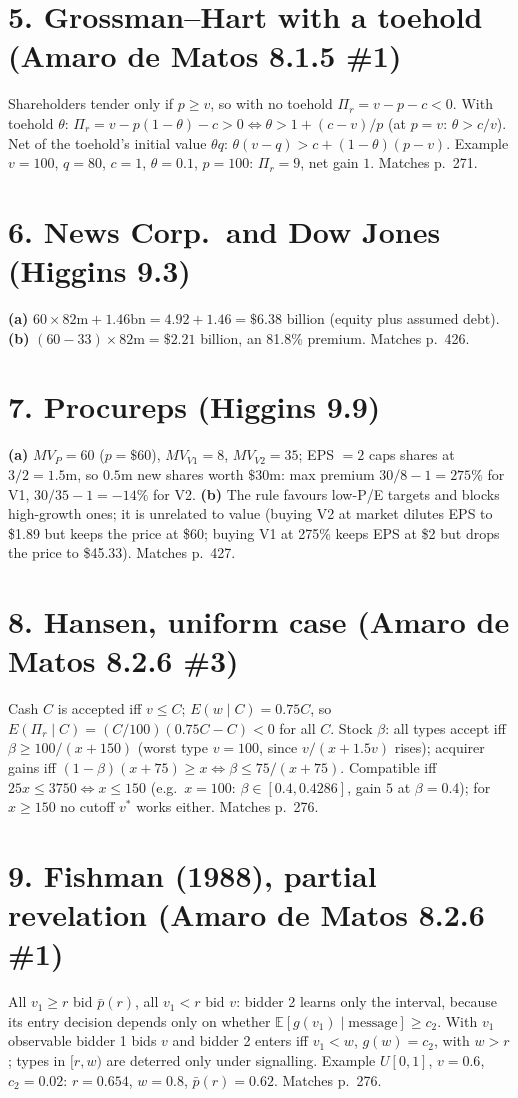 \documentclass[11pt,a4paper]{article}
\newcommand{\E}{\mathbb{E}}
\begin{document}
\section*{5. Grossman--Hart with a toehold (Amaro de Matos 8.1.5 \#1)}
Shareholders tender only if $p\ge v$, so with no toehold $\Pi_r=v-p-c<0$. With toehold $\theta$:
$\Pi_r=v-p(1-\theta)-c>0\iff\theta>1+(c-v)/p$ (at $p=v$: $\theta>c/v$). Net of the toehold's initial value
$\theta q$: $\theta(v-q)>c+(1-\theta)(p-v)$. Example $v=100$, $q=80$, $c=1$, $\theta=0.1$, $p=100$: $\Pi_r=9$,
net gain $1$. Matches p.~271.

\section*{6. News Corp.\ and Dow Jones (Higgins 9.3)}
\textbf{(a)} $60\times82\text{m}+1.46\text{bn}=4.92+1.46=\$6.38$ billion (equity plus assumed debt).
\textbf{(b)} $(60-33)\times82\text{m}=\$2.21$ billion, an 81.8\% premium. Matches p.~426.

\section*{7. Procureps (Higgins 9.9)}
\textbf{(a)} $MV_P=60$ ($p=\$60$), $MV_{V1}=8$, $MV_{V2}=35$; EPS $=2$ caps shares at $3/2=1.5$m, so
$0.5$m new shares worth $\$30$m: max premium $30/8-1=275\%$ for V1, $30/35-1=-14\%$ for V2.
\textbf{(b)} The rule favours low-P/E targets and blocks high-growth ones; it is unrelated to value
(buying V2 at market dilutes EPS to \$1.89 but keeps the price at \$60; buying V1 at 275\% keeps EPS at \$2
but drops the price to \$45.33). Matches p.~427.

\section*{8. Hansen, uniform case (Amaro de Matos 8.2.6 \#3)}
Cash $C$ is accepted iff $v\le C$; $E(w\mid C)=0.75C$, so $E(\Pi_r\mid C)=(C/100)(0.75C-C)<0$ for all $C$.
Stock $\beta$: all types accept iff $\beta\ge100/(x+150)$ (worst type $v=100$, since $v/(x+1.5v)$ rises);
acquirer gains iff $(1-\beta)(x+75)\ge x\iff\beta\le75/(x+75)$. Compatible iff $25x\le3750\iff x\le150$
(e.g.\ $x=100$: $\beta\in[0.4,0.4286]$, gain $5$ at $\beta=0.4$); for $x\ge150$ no cutoff $v^*$ works either. Matches p.~276.

\section*{9. Fishman (1988), partial revelation (Amaro de Matos 8.2.6 \#1)}
All $v_1\ge r$ bid $\bar p(r)$, all $v_1<r$ bid $v$: bidder 2 learns only the interval, because its entry
decision depends only on whether $\E[g(v_1)\mid\text{message}]\ge c_2$. With $v_1$ observable bidder 1 bids $v$
and bidder 2 enters iff $v_1<w$, $g(w)=c_2$, with $w>r$; types in $[r,w)$ are deterred only under
signalling. Example $U[0,1]$, $v=0.6$, $c_2=0.02$: $r=0.654$, $w=0.8$, $\bar p(r)=0.62$. Matches p.~276.
\end{document}
